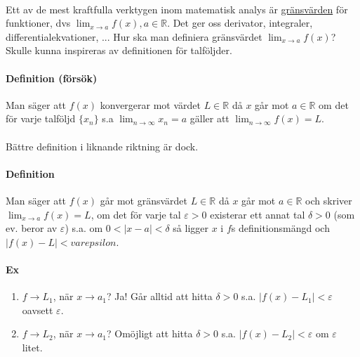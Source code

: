 \paragraph{} Ett av de mest kraftfulla verktygen inom matematisk analys är \underline{gränsvärden} för funktioner, dvs $\lim_{x \to a}f(x),a\in\mathbb{R}$.
Det ger oss derivator, integraler, differentialekvationer, ...
Hur ska man definiera gränsvärdet $\lim_{x \to a}f(x)$?
Skulle kunna inspireras av definitionen för talföljder.
\paragraph{Definition (försök)} Man säger att $f(x)$ konvergerar mot värdet $L\in\mathbb{R}$ då $x$ går mot $a\in\mathbb{R}$ om det för varje talföljd $\{x_n\}$ s.a $\lim_{n\to\infty}x_n=a$ gäller att $\lim_{n\to\infty}f(x)=L$.
\\\\Bättre definition i liknande riktning är dock.
\paragraph{Definition} Man säger att $f(x)$ går mot gränsvärdet
$L\in\mathbb{R}$ då $x$ går mot $a\in\mathbb{R}$ och skriver
$\lim_{x\to a}f(x)=L$, om det för varje tal $\varepsilon > 0$
existerar ett annat tal $\delta > 0$ (som ev. beror av $\varepsilon$) s.a.
om $0< |x-a| <\delta$ så ligger $x$ i $f$s definitionsmängd och
$|f(x)-L|<varepsilon$.

\paragraph{Ex}
\begin{enumerate}
    \item $f\to L_1$, när $x\to a_1$?
          Ja! Går alltid att hitta $\delta>0$ s.a. $|f(x)-L_1|<\varepsilon$ oavsett $\varepsilon$.
    \item $f\to L_2$, när $x\to a_1$?
          Omöjligt att hitta $\delta>0$ s.a. $|f(x)-L_2|<\varepsilon$ om $\varepsilon$ litet.
\end{enumerate}

